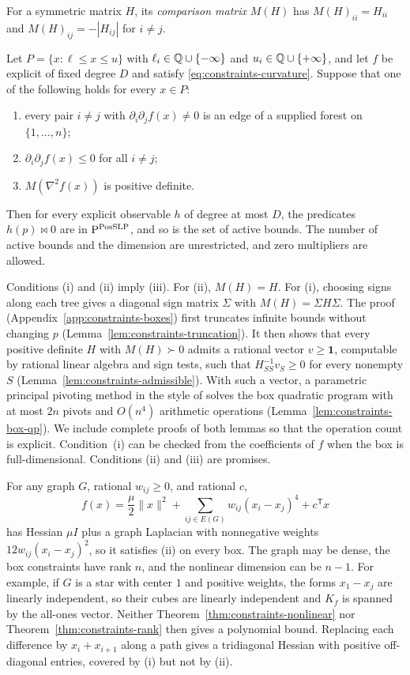 For a symmetric matrix $H$, its \emph{comparison matrix} $M(H)$ has
$M(H)_{ii}=H_{ii}$ and $M(H)_{ij}=-|H_{ij}|$ for $i\ne j$.

\begin{corollary}
\label{cor:constraints-boxes}
Let $P=\{x:\ell\le x\le u\}$ with $\ell_i\in\mathbb Q\cup\{-\infty\}$ and
$u_i\in\mathbb Q\cup\{+\infty\}$, and let $f$ be explicit of fixed degree $D$ and
satisfy \eqref{eq:constraints-curvature}. Suppose that one of the following
holds for every $x\in P$:
\begin{enumerate}[label=(\roman*)]
\item every pair $i\ne j$ with $\partial_i\partial_jf(x)\ne0$ is an edge of a
supplied forest on $\{1,\ldots,n\}$;
\item $\partial_i\partial_jf(x)\le0$ for all $i\ne j$;
\item $M(\nabla^2f(x))$ is positive definite.
\end{enumerate}
Then for every explicit observable $h$ of degree at most $D$, the predicates
$h(p)\bowtie0$ are in $\mathrm P^{\mathrm{PosSLP}}$, and so is the set of active
bounds. The number of active bounds and the dimension are unrestricted, and
zero multipliers are allowed.
\end{corollary}

Conditions (i) and (ii) imply (iii). For (ii), $M(H)=H$. For (i), choosing
signs along each tree gives a diagonal sign matrix $\Sigma$ with
$M(H)=\Sigma H\Sigma$. The proof (Appendix~\ref{app:constraints-boxes})
first truncates infinite bounds without changing $p$
(Lemma~\ref{lem:constraints-truncation}). It then shows that every positive
definite $H$ with $M(H)\succ0$ admits a rational vector $v\ge\mathbf 1$,
computable by rational linear algebra and sign tests, such that
$H_{SS}^{-1}v_S\ge0$ for every nonempty $S$
(Lemma~\ref{lem:constraints-admissible}). With such a vector, a parametric
principal pivoting method in the style of \citet[Algorithm~I]{PangHan2023}
solves the box quadratic program with at most $2n$ pivots and $O(n^4)$
arithmetic operations (Lemma~\ref{lem:constraints-box-qp}). We include
complete proofs of both lemmas so that the operation count is explicit.
Condition~(i) can be checked from the coefficients of $f$ when the box is
full-dimensional. Conditions (ii) and (iii) are promises.

For any graph $G$, rational $w_{ij}\ge0$, and rational $c$,
\[
 f(x)=\frac\mu2\|x\|^2+\sum_{ij\in E(G)}w_{ij}(x_i-x_j)^4+c^{\mathsf T}x
\]
has Hessian $\mu I$ plus a graph Laplacian with nonnegative weights
$12w_{ij}(x_i-x_j)^2$, so it satisfies (ii) on every box. The graph may be
dense, the box constraints have rank $n$, and the nonlinear dimension can be
$n-1$. For example, if $G$ is a star with center $1$ and positive weights,
the forms $x_1-x_j$ are linearly independent, so their cubes are linearly
independent and $K_f$ is spanned by the all-ones vector. Neither
Theorem~\ref{thm:constraints-nonlinear} nor Theorem~\ref{thm:constraints-rank}
then gives a polynomial bound. Replacing each difference by
$x_i+x_{i+1}$ along a path gives a tridiagonal Hessian with positive
off-diagonal entries, covered by (i) but not by (ii).

